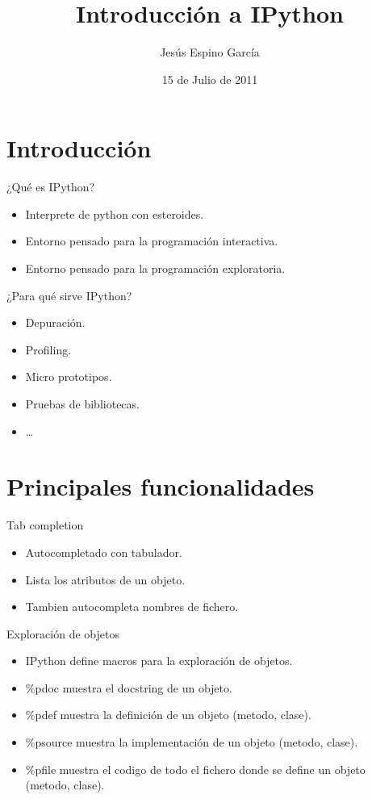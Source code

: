 \documentclass[10pt]{beamer}
\title{Introducción a IPython}
\author{Jesús Espino García}
\date{15 de Julio de 2011}
\institute[Python Madrid 2011]{Kaleidos\\Python Madrid 2011}
\begin{document}
  \frame{\maketitle}


  \section*{Introducción}
  \begin{frame}{¿Qué es IPython?}
    \begin{itemize}
      \item Interprete de python con esteroides.
      \item Entorno pensado para la programación interactiva.
      \item Entorno pensado para la programación exploratoria.
    \end{itemize}
  \end{frame}
  
  \begin{frame}{¿Para qué sirve IPython?}
    \begin{itemize}
      \item Depuración.
      \item Profiling.
      \item Micro prototipos.
      \item Pruebas de bibliotecas.
      \item \dots{}
    \end{itemize}
  \end{frame}
  
  \section*{Principales funcionalidades}
  \begin{frame}{Tab completion}
    \begin{itemize}
      \item Autocompletado con tabulador.
      \item Lista los atributos de un objeto.
      \item Tambien autocompleta nombres de fichero.
    \end{itemize}
  \end{frame}

  \begin{frame}{Exploración de objetos}
    \begin{itemize}
      \item IPython define macros para la exploración de objetos.
      \item \%pdoc muestra el docstring de un objeto.
      \item \%pdef muestra la definición de un objeto (metodo, clase).
      \item \%psource muestra la implementación de un objeto (metodo, clase).
      \item \%pfile muestra el codigo de todo el fichero donde se define un objeto (metodo, clase).
    \end{itemize}
  \end{frame}
\end{document}
